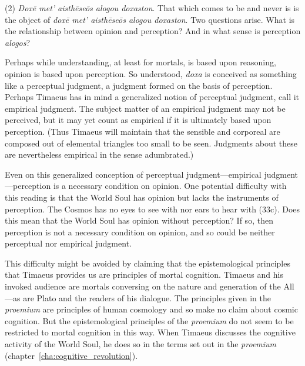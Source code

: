 (2) \emph{Doxē met' aisthēseōs alogou doxaston}. That which comes to be and never is is the object of \emph{doxē met' aisthēseōs alogou doxaston}. Two questions arise. What is the relationship between opinion and perception? And in what sense is perception \emph{alogos}? 

Perhaps while understanding, at least for mortals, is based upon reasoning, opinion is based upon perception. So understood, \emph{doxa} is conceived as something like a perceptual judgment, a judgment formed on the basis of perception. Perhaps Timaeus has in mind a generalized notion of perceptual judgment, call it empirical judgment. The subject matter of an empirical judgment may not be perceived, but it may yet count as empirical if it is ultimately based upon perception. (Thus Timaeus will maintain that the sensible and corporeal are composed out of elemental triangles too small to be seen. Judgments about these are nevertheless empirical in the sense adumbrated.)

Even on this generalized conception of perceptual judgment---empirical judgment---perception is a necessary condition on opinion. One potential difficulty with this reading is that the World Soul has opinion but lacks the instruments of perception. The Cosmos has no eyes to see with nor ears to hear with (33c). Does this mean that the World Soul has opinion without perception? If so, then perception is not a necessary condition on opinion, and so could be neither perceptual nor empirical judgment. 

This difficulty might be avoided by claiming that the epistemological principles that Timaeus provides us are principles of mortal cognition. Timaeus and his invoked audience are mortals conversing on the nature and generation of the All---as are Plato and the readers of his dialogue. The principles given in the \emph{proemium} are principles of human cosmology and so make no claim about cosmic cognition. But the epistemological principles of the \emph{proemium} do not seem to be restricted to mortal cognition in this way. When Timaeus discusses the cognitive activity of the World Soul, he does so in the terms set out in the \emph{proemium} (chapter~\ref{cha:cognitive_revolution}).

